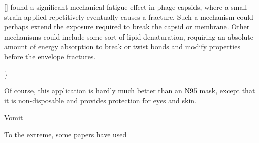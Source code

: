 \documentclass[fleqn,10pt]{article}
\begin{document}
[] found a significant mechanical fatigue effect in phage capsids, where a small strain applied repetitively eventually causes a fracture. Such a mechanism could perhaps extend the exposure required to break the capsid or membrane. Other mechanisms could include some sort of lipid denaturation, requiring an absolute amount of energy absorption to break or twist bonds and modify properties before the envelope fractures.


{\color{red}  \} } 




\clearpage



Of course, this application is hardly much better than an N95 mask, except that it is non-disposable and provides protection for eyes and skin.

Vomit



To the extreme, some papers have used


















\end{document}
